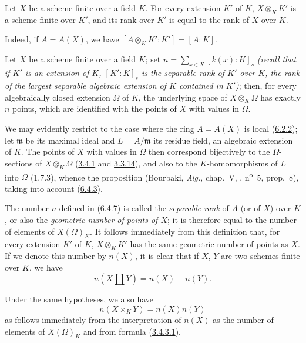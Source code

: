 \begin{corollary}[6.4.6]
\label{I.6.4.6}
Let $X$ be a scheme finite over a field $K$. For every extension $K'$ of $K$,
$X\otimes_K K'$ is a scheme finite over $K'$, and its rank over $K'$ is equal
to the rank of $X$ over $K$.
\end{corollary}

Indeed, if $A=A(X)$, we have $[A\otimes_K K':K']=[A:K]$.

\begin{corollary}[6.4.7]
\label{I.6.4.7}
Let $X$ be a scheme finite over a field $K$; set
$n=\sum_{x\in X}[k(x):K]_s$
\emph{(recall that if $K'$ is an extension of $K$, $[K':K]_s$ is the
\emph{separable rank} of $K'$ over $K$, the rank of the largest separable
algebraic extension of $K$ contained in $K'$)};
then, for every algebraically closed extension $\Omega$ of $K$, the
underlying space of $X\otimes_K\Omega$ has exactly $n$ points, which are
identified with the points of $X$ with values in $\Omega$.
\end{corollary}

We may evidently restrict to the case where the ring $A=A(X)$ is local
(\hyperref[I.6.2.2]{6.2.2}); let $\mathfrak m$ be its maximal ideal and
$L=A/\mathfrak m$ its residue field, an algebraic extension of $K$. The points
of $X$ with values in $\Omega$ then correspond bijectively to the
$\Omega$-sections of $X\otimes_K\Omega$
(\hyperref[I.3.4.1]{3.4.1} and \hyperref[I.3.3.14]{3.3.14}), and also
to the $K$-homomorphisms of $L$ into $\Omega$
(\hyperref[I.1.7.3]{1.7.3}), whence the proposition (Bourbaki, \emph{Alg.},
chap.~V, , n\textsuperscript{o}~5, prop.~8), taking into
account (\hyperref[I.6.4.3]{6.4.3}).

\begin{env}[6.4.8]
\label{I.6.4.8}
The number $n$ defined in (\hyperref[I.6.4.7]{6.4.7}) is called the
\emph{separable rank} of $A$ (or of $X$) over $K$, or also the
\emph{geometric number of points of $X$}; it is therefore equal to the number
of elements of $X(\Omega)_K$. It follows immediately from this definition
that, for every extension $K'$ of $K$, $X\otimes_K K'$ has the same geometric
number of points as $X$. If we denote this number by $n(X)$, it is clear that
if $X$, $Y$ are two schemes finite over $K$, we have
\[
  n(X\amalg Y)=n(X)+n(Y).
  \tag{6.4.8.1}\label{I.6.4.8.1}
\]

Under the same hypotheses, we also have
\[
  n(X\times_K Y)=n(X)n(Y)
  \tag{6.4.8.2}\label{I.6.4.8.2}
\]
as follows immediately from the interpretation of $n(X)$ as the number
of elements of $X(\Omega)_K$ and from formula
(\hyperref[I.3.4.3.1]{3.4.3.1}).
\end{env}

